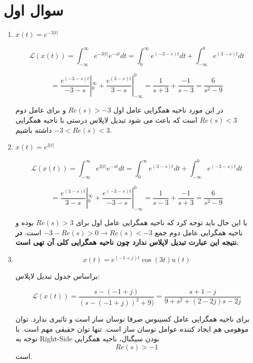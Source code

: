 \documentclass[12pt]{article}
\begin{document}
\KashidaOff

\section{سوال اول}


\begin{enumerate}[label = \Alph*)]
	

	\item
	$x(t) = e^{-3 |t|}$
	
		$$\mathcal{L}(x(t)) = \int_{-\infty}^{\infty} e^{-3 |t|} e^{-s t} dt = \int_{0}^{\infty} e^{(-3-s)t} dt+ \int_{-\infty}^{0} e^{(3-s)t} dt$$
	
	$$= \frac{e^{(-3-s)t}}{-3-s}|_{0}^{\infty} + \frac{e^{(3-s)t}}{3-s}|_{-\infty}^{0} = \frac{1}{s+3} + \frac{-1}{s-3} = \frac{6}{s^2 - 9}$$
	
	در این مورد ناحیه همگرایی عامل اول
	 $Re(s) >-3$
	 و برای عامل دوم
	 $Re(s)<3$
	 است که باعث می شود تبدیل لاپلاس درستی با ناحیه همگرایی
	 $-3 < Re(s) < 3$
	 داشته باشیم.
	 
	 
	 	\item
	 $x(t) = e^{3 |t|}$
	 
	 $$\mathcal{L}(x(t)) = \int_{-\infty}^{\infty} e^{3 |t|} e^{-s t} dt = \int_{0}^{\infty} e^{(3-s)t} dt+ \int_{-\infty}^{0} e^{(-3-s)t} dt$$
	 
	 $$= \frac{e^{(3-s)t}}{3-s}|_{0}^{\infty} + \frac{e^{(-3-s)t}}{-3-s}|_{-\infty}^{0} = \frac{1}{s-3} + \frac{-1}{s+3} = \frac{6}{s^2 - 9}$$
	 
	 با این حال باید توجه کرد که ناحیه همگرایی عامل اول برای $Re(s)>3$ بوده و ناحیه همگرایی عامل دوم جمع
	 $-3 - Re(s) > 0 \rightarrow Re(s)<-3$
	 است. \textbf{در نتیجه این عبارت تبدیل لاپلاس ندارد چون ناحیه همگرایی کلی آن تهی است.}
	 
	 
	 
	 \item
	 $$x(t) =e^{(-1 + j) t} \cos(3t) u(t)$$
	
	
	براساس جدول تبدیل لاپلاس:
	
	$$\mathcal{L}(x(t)) = \frac{s - (-1 +j)}{(s - (-1 +j))^2 + 9)} = \frac{s +1 - j}{9 + s^2 + (2-2j)s - 2j}$$
	
	برای ناحیه همگرایی عامل کسینوس صرفا نوسان ساز است و تاثیری ندارد. توان موهومی هم ایجاد کننده عوامل نوسان ساز است. تنها توان حقیقی مهم است. با توجه به Right-Side بودن سیگنال، ناحیه همگرایی
	$$Re(s)>-1$$
	است.
	
	
	
\end{enumerate}
\end{document}
